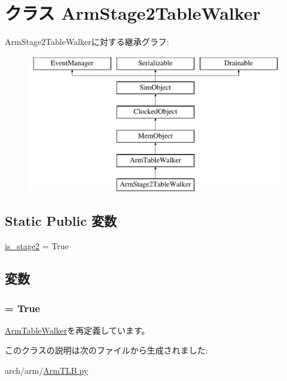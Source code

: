 \hypertarget{classArmTLB_1_1ArmStage2TableWalker}{
\section{クラス ArmStage2TableWalker}
\label{classArmTLB_1_1ArmStage2TableWalker}
}
ArmStage2TableWalkerに対する継承グラフ:\begin{figure}[H]
\begin{center}
\leavevmode
\includegraphics[height=6cm]{classArmTLB_1_1ArmStage2TableWalker}
\end{center}
\end{figure}
\subsection*{Static Public 変数}
\begin{DoxyCompactItemize}
\item 
\hyperlink{classArmTLB_1_1ArmStage2TableWalker_ae8e57fdf256a1e5df80b0c5ab8a52336}{is\_\-stage2} = True
\end{DoxyCompactItemize}


\subsection{変数}
\hypertarget{classArmTLB_1_1ArmStage2TableWalker_ae8e57fdf256a1e5df80b0c5ab8a52336}{
\subsubsection[{is\_\-stage2}]{ = True}}
\label{classArmTLB_1_1ArmStage2TableWalker_ae8e57fdf256a1e5df80b0c5ab8a52336}


\hyperlink{classArmTLB_1_1ArmTableWalker_a79c1ca5c107632a64c9583c96fbcc282}{ArmTableWalker}を再定義しています。

このクラスの説明は次のファイルから生成されました:\begin{DoxyCompactItemize}
\item 
arch/arm/\hyperlink{ArmTLB_8py}{ArmTLB.py}\end{DoxyCompactItemize}

